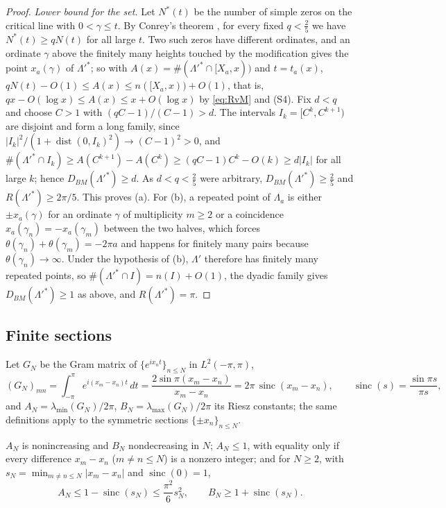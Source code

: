\documentclass[11pt]{article}
\DeclareMathOperator{\dist}{dist}
\DeclareMathOperator{\sinc}{sinc}
\newcommand{\Lam}{\Lambda}
\begin{document}
\begin{proof}
\emph{Lower bound for the set.} Let $N^\ast(t)$ be the number of simple zeros on the critical line with $0<\gamma\le t$. By Conrey's theorem \cite[Theorem~1]{Conrey89}, for every fixed $q<\frac25$ we have $N^\ast(t)\ge qN(t)$ for all large $t$. Two such zeros have different ordinates, and an ordinate $\gamma$ above the finitely many heights touched by the modification gives the point $x_a(\gamma)$ of $\Lam'^\ast$; so with $A(x)=\#(\Lam'^\ast\cap[X_a,x))$ and $t=t_a(x)$, $qN(t)-O(1)\le A(x)\le n([X_a,x))+O(1)$, that is, $qx-O(\log x)\le A(x)\le x+O(\log x)$ by \eqref{eq:RvM} and (S4). Fix $d<q$ and choose $C>1$ with $(qC-1)/(C-1)>d$. The intervals $I_k=[C^k,C^{k+1})$ are disjoint and form a long family, since $|I_k|^2/(1+\dist(0,I_k)^2)\to(C-1)^2>0$, and $\#(\Lam'^\ast\cap I_k)\ge A(C^{k+1})-A(C^k)\ge(qC-1)C^k-O(k)\ge d|I_k|$ for all large $k$; hence $D_{BM}(\Lam'^\ast)\ge d$. As $d<q<\frac25$ were arbitrary, $D_{BM}(\Lam'^\ast)\ge\frac25$ and $R(\Lam'^\ast)\ge2\pi/5$. This proves (a). For (b), a repeated point of $\Lam_a$ is either $\pm x_a(\gamma)$ for an ordinate $\gamma$ of multiplicity $m\ge2$ or a coincidence $x_a(\gamma_n)=-x_a(\gamma_m)$ between the two halves, which forces $\theta(\gamma_n)+\theta(\gamma_m)=-2\pi a$ and happens for finitely many pairs because $\theta(\gamma_n)\to\infty$. Under the hypothesis of (b), $\Lam'$ therefore has finitely many repeated points, so $\#(\Lam'^\ast\cap I)=n(I)+O(1)$, the dyadic family gives $D_{BM}(\Lam'^\ast)\ge1$ as above, and $R(\Lam'^\ast)=\pi$.
\end{proof}

\subsection{Finite sections}
Let $G_N$ be the Gram matrix of $\{e^{ix_nt}\}_{n\le N}$ in $L^2(-\pi,\pi)$,
\[
(G_N)_{mn}=\int_{-\pi}^{\pi}e^{i(x_m-x_n)t}\,dt=\frac{2\sin\pi(x_m-x_n)}{x_m-x_n}=2\pi\,\sinc(x_m-x_n),\qquad\sinc(s)=\frac{\sin\pi s}{\pi s},
\]
and $A_N=\lambda_{\min}(G_N)/2\pi$, $B_N=\lambda_{\max}(G_N)/2\pi$ its Riesz constants; the same definitions apply to the symmetric sections $\{\pm x_n\}_{n\le N}$.

\begin{proposition}\label{prop:finite}
$A_N$ is nonincreasing and $B_N$ nondecreasing in $N$; $A_N\le1$, with equality only if every difference $x_m-x_n$ ($m\ne n\le N$) is a nonzero integer; and for $N\ge2$, with $s_N=\min_{m\ne n\le N}|x_m-x_n|$ and $\sinc(0)=1$,
\[
A_N\le1-\sinc(s_N)\le\frac{\pi^2}{6}s_N^2,\qquad B_N\ge1+\sinc(s_N).
\]
\end{proposition}
\end{document}
